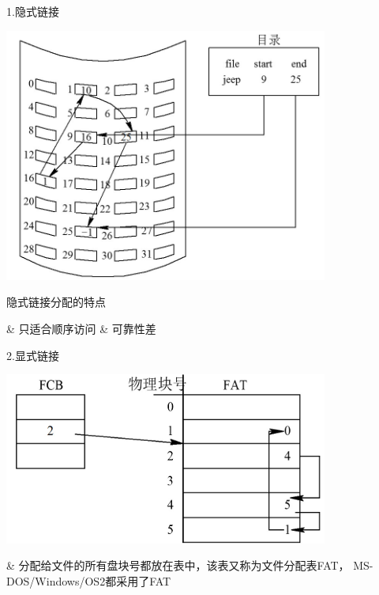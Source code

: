\begin{frame}[fragile]{1.隐式链接}
  \begin{center}
    \includegraphics[width=0.8\textwidth]{figure/file/alloc-link.jpg}
  \end{center}
\end{frame}

\begin{frame}[fragile]{隐式链接分配的特点}
  \begin{easylist}
    & 只适合顺序访问
    & 可靠性差
  \end{easylist}
\end{frame}

\begin{frame}[fragile]{2.显式链接}
\begin{center}
    \includegraphics[width=0.8\textwidth]{figure/file/alloc-link-explict.jpg}
  \end{center}
  \begin{easylist}
    & 分配给文件的所有盘块号都放在表中，该表又称为文件分配表FAT， MS-DOS/Windows/OS2都采用了FAT
  \end{easylist}
\end{frame}

